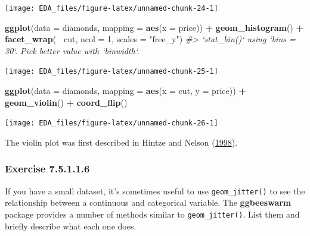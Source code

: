 \documentclass[]{book}
\newenvironment{Shaded}{\begin{snugshade}}{\end{snugshade}}
\newcommand{\CommentTok}[1]{\textcolor[rgb]{0.56,0.35,0.01}{\textit{#1}}}
\newcommand{\DataTypeTok}[1]{\textcolor[rgb]{0.13,0.29,0.53}{#1}}
\newcommand{\DecValTok}[1]{\textcolor[rgb]{0.00,0.00,0.81}{#1}}
\newcommand{\KeywordTok}[1]{\textcolor[rgb]{0.13,0.29,0.53}{\textbf{#1}}}
\newcommand{\NormalTok}[1]{#1}
\newcommand{\OperatorTok}[1]{\textcolor[rgb]{0.81,0.36,0.00}{\textbf{#1}}}
\newcommand{\StringTok}[1]{\textcolor[rgb]{0.31,0.60,0.02}{#1}}
\theoremstyle{plain}
\theoremstyle{remark}
\begin{document}
\begin{center}\texttt{[image: EDA\_files/figure-latex/unnamed-chunk-24-1]} \end{center}

\begin{Shaded}
\begin{Highlighting}[]
\KeywordTok{ggplot}\NormalTok{(}\DataTypeTok{data =}\NormalTok{ diamonds, }\DataTypeTok{mapping =} \KeywordTok{aes}\NormalTok{(}\DataTypeTok{x =}\NormalTok{ price)) }\OperatorTok{+}
\StringTok{  }\KeywordTok{geom_histogram}\NormalTok{() }\OperatorTok{+}
\StringTok{  }\KeywordTok{facet_wrap}\NormalTok{(}\OperatorTok{~}\StringTok{ }\NormalTok{cut, }\DataTypeTok{ncol =} \DecValTok{1}\NormalTok{, }\DataTypeTok{scales =} \StringTok{"free_y"}\NormalTok{)}
\CommentTok{#> `stat_bin()` using `bins = 30`. Pick better value with `binwidth`.}
\end{Highlighting}
\end{Shaded}

\begin{center}\texttt{[image: EDA\_files/figure-latex/unnamed-chunk-25-1]} \end{center}

\begin{Shaded}
\begin{Highlighting}[]
\KeywordTok{ggplot}\NormalTok{(}\DataTypeTok{data =}\NormalTok{ diamonds, }\DataTypeTok{mapping =} \KeywordTok{aes}\NormalTok{(}\DataTypeTok{x =}\NormalTok{ cut, }\DataTypeTok{y =}\NormalTok{ price)) }\OperatorTok{+}
\StringTok{  }\KeywordTok{geom_violin}\NormalTok{() }\OperatorTok{+}
\StringTok{  }\KeywordTok{coord_flip}\NormalTok{()}
\end{Highlighting}
\end{Shaded}

\begin{center}\texttt{[image: EDA\_files/figure-latex/unnamed-chunk-26-1]} \end{center}

The violin plot was first described in Hintze and Nelson (\protect\hyperlink{ref-HintzeNelson1998}{1998}).

\hypertarget{exercise-7.5.1.1.6}{%
\subsubsection*{\texorpdfstring{Exercise {7.5.1.1.6}}{Exercise 7.5.1.1.6}}\label{exercise-7.5.1.1.6}}

If you have a small dataset, it's sometimes useful to use \texttt{geom\_jitter()} to see the relationship between a continuous and categorical variable.
The \textbf{ggbeeswarm} package provides a number of methods similar to \texttt{geom\_jitter()}.
List them and briefly describe what each one does.
\end{document}
